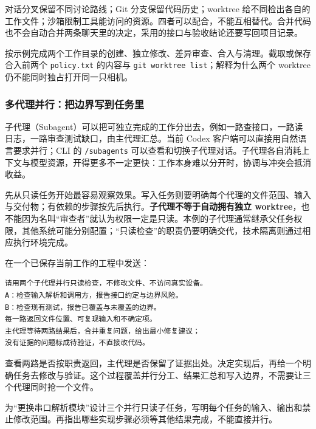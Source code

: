 \begin{conclusion}
对话分叉保留不同讨论路线；Git 分支保留代码历史；worktree 给不同检出各自的工作文件；沙箱限制工具能访问的资源。四者可以配合，不能互相替代。合并代码也不会自动合并两条聊天里的决定，采用的接口与验收结论还要写回项目记录。
\end{conclusion}

\begin{exercise}\label{ex:ai-workflow-worktree}
按示例完成两个工作目录的创建、独立修改、差异审查、合入与清理。截取或保存合入前两个 \texttt{policy.txt} 的内容与 \texttt{git worktree list}；解释为什么两个 worktree 仍不能同时独占打开同一只相机。
\end{exercise}

\subsubsection{多代理并行：把边界写到任务里}

子代理（Subagent）可以把可独立完成的工作分出去，例如一路查接口，一路读日志，一路审查测试缺口，由主代理汇总。当前 Codex 客户端可以直接用自然语言要求并行；CLI 的 \texttt{/subagents} 可以查看和切换子代理对话。子代理各自消耗上下文与模型资源，开得更多不一定更快：工作本身难以分开时，协调与冲突会抵消收益。

先从只读任务开始最容易观察效果。写入任务则要明确每个代理的文件范围、输入与交付物；有依赖的步骤按先后执行。\textbf{子代理不等于自动拥有独立 worktree}，也不能因为名叫“审查者”就认为权限一定是只读。本例的子代理通常继承父任务权限，其他系统可能分别配置；“只读检查”的职责仍要明确交代，技术隔离则通过相应执行环境完成。

\begin{example}
在一个已保存当前工作的工程中发送：
\begin{lstlisting}[language={}]
请用两个子代理并行只读检查，不修改文件、不访问真实设备。
A：检查输入解析和调用方，报告接口约定与边界风险。
B：检查现有测试，报告已覆盖与未覆盖的边界。
每一路返回文件位置、可复现输入和不确定项。
主代理等待两路结果后，合并重复问题，给出最小修复建议；
没有证据的问题标成待验证，不直接改代码。
\end{lstlisting}
查看两路是否按职责返回，主代理是否保留了证据出处。决定实现后，再给一个明确任务去修改与验证。这个过程覆盖并行分工、结果汇总和写入边界，不需要让三个代理同时抢一个文件。
\end{example}

\begin{exercise}\label{ex:ai-workflow-parallel}
为“更换串口解析模块”设计三个并行只读子任务，写明每个任务的输入、输出和禁止修改范围。再指出哪些实现步骤必须等其他结果完成，不能直接并行。
\end{exercise}

